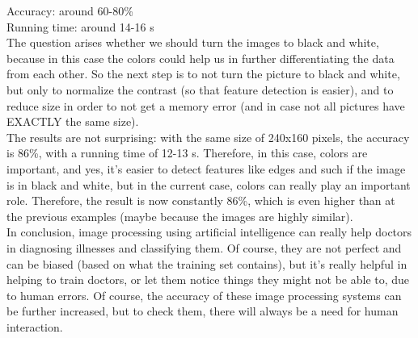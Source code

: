 \documentclass[a4paper,10pt]{article}
\newcommand\tab[1][0.5cm]{\hspace*{#1}}
\begin{document}
    Accuracy: around 60-80\% \\
    \tab Running time: around 14-16 s \\
    
    \tab The question arises whether we should turn the images to black and white, because in this case the colors could help us in further differentiating the data from each other. So the next step is to not turn the picture to black and white, but only to normalize the contrast (so that feature detection is easier), and to reduce size in order to not get a memory error (and in case not all pictures have EXACTLY the same size). \\
    \tab The results are not surprising: with the same size of 240x160 pixels, the accuracy is 86\%, with a running time of 12-13 s. Therefore, in this case, colors are important, and yes, it's easier to detect features like edges and such if the image is in black and white, but in the current case, colors can really play an important role. Therefore, the result is now constantly 86\%, which is even higher than at the previous examples (maybe because the images are highly similar).\\
    \tab In conclusion, image processing using artificial intelligence can really help doctors in diagnosing illnesses and classifying them. Of course, they are not perfect and can be biased (based on what the training set contains), but it's really helpful in helping to train doctors, or let them notice things they might not be able to, due to human errors. Of course, the accuracy of these image processing systems can be further increased, but to check them, there will always be a need for human interaction.
    
\end{document}
